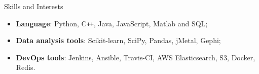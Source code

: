 \documentclass{resume} %
\newenvironment{myitemize}
{ \begin{itemize}[leftmargin=0.2em,label={}]
    \setlength{\itemsep}{0pt}
    \setlength{\parskip}{0pt}
    \setlength{\parsep}{0pt}     }
{ \end{itemize}                  }
\begin{document}
\begin{rSection}{Skills and Interests}
\begin{myitemize}\setlength\itemsep{0.1em}
    \item \textbf{Language}: Python, C\texttt{++}, Java, JavaScript, Matlab and SQL;
    \item \textbf{Data analysis tools}: Scikit-learn, SciPy, Pandas, jMetal, Gephi;
    \item \textbf{DevOps tools}: Jenkins, Ansible, Travis-CI, AWS Elasticsearch, S3, Docker, Redis.
\end{myitemize}


\end{rSection}

\end{document}
